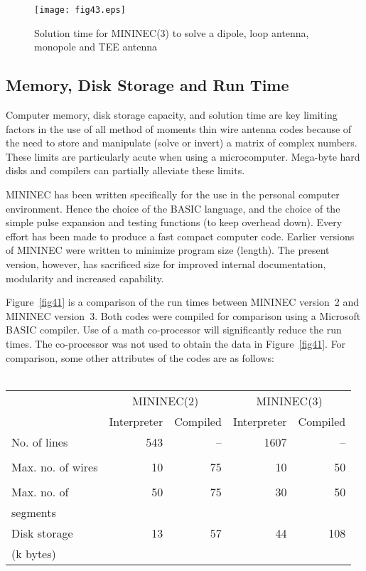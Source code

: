 \documentclass[12pt]{article}
\begin{document}
\begin{sidewaysfigure}[htb]
\centerline{\texttt{[image: fig43.eps]}}
\caption{Solution time for MININEC(3) to solve a dipole, loop antenna,
monopole and TEE antenna}
\label{fig43}
\end{sidewaysfigure}
\afterpage\clearpage

\subsection{Memory, Disk Storage and Run Time}
Computer memory, disk storage capacity, and solution time are key
limiting factors in the use of all method of moments thin wire antenna
codes because of the need to store and manipulate (solve or invert) a
matrix of complex numbers. These limits are particularly acute when
using a microcomputer. Mega-byte hard disks and compilers can partially
alleviate these limits.

MININEC has been written specifically for the use in the personal
computer environment. Hence the choice of the BASIC language, and the
choice of the simple pulse expansion and testing functions (to keep
overhead down). Every effort has been made to produce a fast compact
computer code. Earlier versions of MININEC were written to minimize
program size (length). The present version, however, has sacrificed size
for improved internal documentation, modularity and increased
capability.

Figure~\ref{fig41} is a comparison of the run times between MININEC
version~2 and MININEC version~3. Both codes were compiled for comparison
using a Microsoft BASIC compiler. Use of a math co-processor will
significantly reduce the run times. The co-processor was not used to
obtain the data in Figure~\ref{fig41}. For comparison, some other
attributes of the codes are as follows:\\

\ \\
\begin{tabular}{lrrrr}
&
\multicolumn{2}{c}{MININEC(2)} &
\multicolumn{2}{c}{MININEC(3)} \\
&
\multicolumn{1}{c}{Interpreter} &
\multicolumn{1}{c}{Compiled}    &
\multicolumn{1}{c}{Interpreter} &
\multicolumn{1}{c}{Compiled}    \\
No. of lines         & 543 & -- & 1607 &  -- \\
\\
Max. no. of wires    &  10 & 75 &   10 &  50 \\
\\
Max. no. of          &  50 & 75 &   30 &  50 \\
\quad segments \\
Disk storage         &  13 & 57 &   44 & 108 \\
\quad (k bytes) \\
\end{tabular}
\ \\
\end{document}
